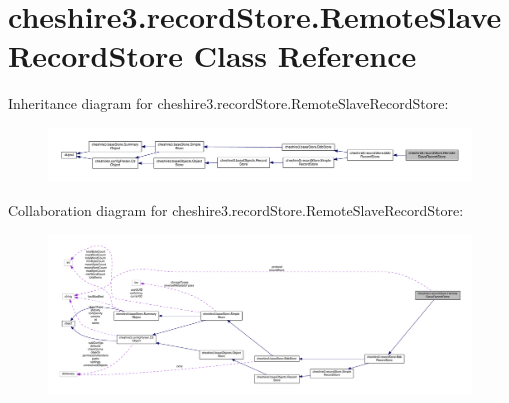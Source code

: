 \hypertarget{classcheshire3_1_1record_store_1_1_remote_slave_record_store}{\section{cheshire3.\-record\-Store.\-Remote\-Slave\-Record\-Store Class Reference}
\label{classcheshire3_1_1record_store_1_1_remote_slave_record_store}
}


Inheritance diagram for cheshire3.\-record\-Store.\-Remote\-Slave\-Record\-Store\-:
\nopagebreak
\begin{figure}[H]
\begin{center}
\leavevmode
\includegraphics[width=350pt]{classcheshire3_1_1record_store_1_1_remote_slave_record_store__inherit__graph}
\end{center}
\end{figure}


Collaboration diagram for cheshire3.\-record\-Store.\-Remote\-Slave\-Record\-Store\-:
\nopagebreak
\begin{figure}[H]
\begin{center}
\leavevmode
\includegraphics[width=350pt]{classcheshire3_1_1record_store_1_1_remote_slave_record_store__coll__graph}
\end{center}
\end{figure}

